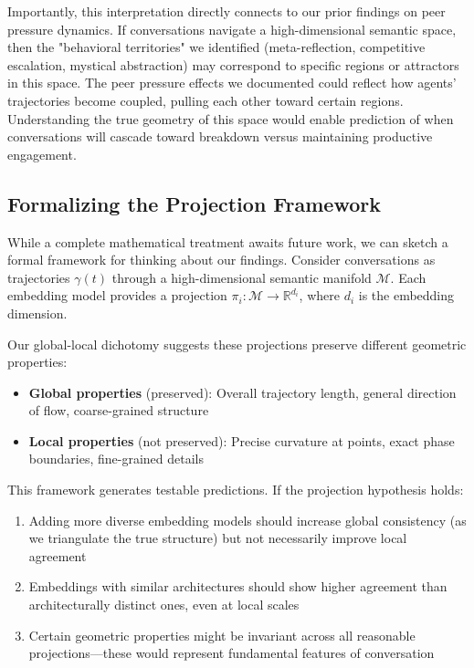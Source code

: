 \documentclass[11pt,letterpaper]{article}
\begin{document}
Importantly, this interpretation directly connects to our prior findings on peer pressure dynamics. If conversations navigate a high-dimensional semantic space, then the "behavioral territories" we identified (meta-reflection, competitive escalation, mystical abstraction) may correspond to specific regions or attractors in this space. The peer pressure effects we documented could reflect how agents' trajectories become coupled, pulling each other toward certain regions. Understanding the true geometry of this space would enable prediction of when conversations will cascade toward breakdown versus maintaining productive engagement.

\subsection{Formalizing the Projection Framework}

While a complete mathematical treatment awaits future work, we can sketch a formal framework for thinking about our findings. Consider conversations as trajectories $\gamma(t)$ through a high-dimensional semantic manifold $\mathcal{M}$. Each embedding model provides a projection $\pi_i: \mathcal{M} \to \mathbb{R}^{d_i}$, where $d_i$ is the embedding dimension.

Our global-local dichotomy suggests these projections preserve different geometric properties:
\begin{itemize}
\item \textbf{Global properties} (preserved): Overall trajectory length, general direction of flow, coarse-grained structure
\item \textbf{Local properties} (not preserved): Precise curvature at points, exact phase boundaries, fine-grained details
\end{itemize}

This framework generates testable predictions. If the projection hypothesis holds:
\begin{enumerate}
\item Adding more diverse embedding models should increase global consistency (as we triangulate the true structure) but not necessarily improve local agreement
\item Embeddings with similar architectures should show higher agreement than architecturally distinct ones, even at local scales
\item Certain geometric properties might be invariant across all reasonable projections—these would represent fundamental features of conversation
\end{enumerate}
\end{document}

